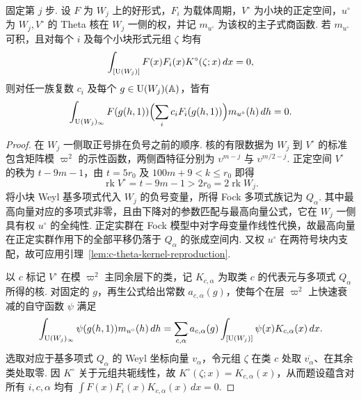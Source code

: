\begin{lemma}[从商上的核配对到实群上的消失]
\label{lem:c-kernel-real-vanishing}
\emitthmsource
固定第 $j$ 步. 设 $F$ 为 $W_j$ 上的好形式，$F_i$ 为载体周期，$V^\circ$ 为小块的正定空间，$u^\circ$ 为 $W_j,V^\circ$ 的 Theta 核在 $W_j$ 一侧的权，并记 $m_{u^\circ}$ 为该权的主子式商函数. 若 $m_{u^\circ}$ 可积，且对每个 $i$ 及每个小块形式元组 $\zeta$ 均有
\[
  \int_{[\operatorname{U}(W_j)]} F(x) F_i(x) K^\circ(\zeta;x)\,dx=0,
\]
则对任一族复数 $c_i$ 及每个 $g\in \operatorname{U}(W_j)(\mathbb A)$，皆有
\[
  \int_{\operatorname{U}(W_j)_\infty}
     F(g(h,1))\Bigl(\sum_i c_i F_i(g(h,1))\Bigr)m_{u^\circ}(h)\,dh=0.
\]
\end{lemma}

\begin{proof}
在 $W_j$ 一侧取正号排在负号之前的顺序. 核的有限数据为 $W_j$ 到 $V^\circ$ 的标准包含矩阵模 $\varpi^2$ 的示性函数，两侧酉特征分别为 $\upsilon^{m-j}$ 与 $\upsilon^{m/2-j}$. 正定空间 $V^\circ$ 的秩为 $t-9m-1$，由 $t=5r_0$ 及 $100m+9<k\le r_0$ 即得
\[
   \operatorname{rk}V^\circ=t-9m-1>2r_0=2\operatorname{rk}W_j .
\]
将小块 Weyl 基多项式代入 $W_j$ 的负号变量，所得 Fock 多项式族记为 $Q_\alpha$. 其中最高向量对应的多项式非零，且由下降对的参数匹配与最高向量公式，它在 $W_j$ 一侧具有权 $u^\circ$ 的全纯性. 正定实群在 Fock 模型中对字母变量作线性代换，故最高向量在正定实群作用下的全部平移仍落于 $Q_\alpha$ 的张成空间内. 又权 $u^\circ$ 在两符号块内支配，故可应用引理~\ref{lem:c-theta-kernel-reproduction}.

以 $c$ 标记 $V^\circ$ 在模 $\varpi^2$ 主同余层下的类，记 $K_{c,\alpha}$ 为取类 $c$ 的代表元与多项式 $Q_\alpha$ 所得的核. 对固定的 $g$，再生公式给出常数 $a_{c,\alpha}(g)$，使每个在层 $\varpi^2$ 上快速衰减的自守函数 $\psi$ 满足
\[
 \int_{\operatorname{U}(W_j)_\infty}\psi(g(h,1))m_{u^\circ}(h)\,dh
 =\sum_{c,\alpha}a_{c,\alpha}(g)
    \int_{[\operatorname{U}(W_j)]}\psi(x)K_{c,\alpha}(x)\,dx .
\]
选取对应于基多项式 $Q_\alpha$ 的 Weyl 坐标向量 $v_\alpha$，令元组 $\zeta$ 在类 $c$ 处取 $\overline{v_\alpha}$、在其余类处取零. 因 $K^\circ$ 关于元组共轭线性，故 $K^\circ(\zeta;x)=K_{c,\alpha}(x)$，从而题设蕴含对所有 $i,c,\alpha$ 均有 $\int F(x)F_i(x)K_{c,\alpha}(x)\,dx=0$.


\end{proof}
